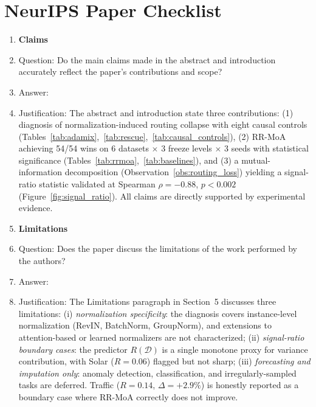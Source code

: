 \section*{NeurIPS Paper Checklist}

\begin{enumerate}

\item {\bf Claims}
    \item[] Question: Do the main claims made in the abstract and introduction accurately reflect the paper's contributions and scope?
    \item[] Answer: \answerYes{}
    \item[] Justification: The abstract and introduction state three contributions: (1) diagnosis of normalization-induced routing collapse with eight causal controls (Tables~\ref{tab:adamix},~\ref{tab:rescue},~\ref{tab:causal_controls}), (2) RR-MoA achieving 54/54 wins on 6 datasets $\times$ 3 freeze levels $\times$ 3 seeds with statistical significance (Tables~\ref{tab:rrmoa},~\ref{tab:baselines}), and (3) a mutual-information decomposition (Observation~\ref{obs:routing_loss}) yielding a signal-ratio statistic validated at Spearman $\rho=-0.88$, $p<0.002$ (Figure~\ref{fig:signal_ratio}). All claims are directly supported by experimental evidence.

\item {\bf Limitations}
    \item[] Question: Does the paper discuss the limitations of the work performed by the authors?
    \item[] Answer: \answerYes{}
    \item[] Justification: The Limitations paragraph in Section~5 discusses three limitations: (i) \emph{normalization specificity}: the diagnosis covers instance-level normalization (RevIN, BatchNorm, GroupNorm), and extensions to attention-based or learned normalizers are not characterized; (ii) \emph{signal-ratio boundary cases}: the predictor $R(\mathcal{D})$ is a single monotone proxy for variance contribution, with Solar ($R{=}0.06$) flagged but not sharp; (iii) \emph{forecasting and imputation only}: anomaly detection, classification, and irregularly-sampled tasks are deferred. Traffic ($R{=}0.14$, $\Delta{=}{+}2.9\%$) is honestly reported as a boundary case where RR-MoA correctly does not improve.


\end{enumerate}

